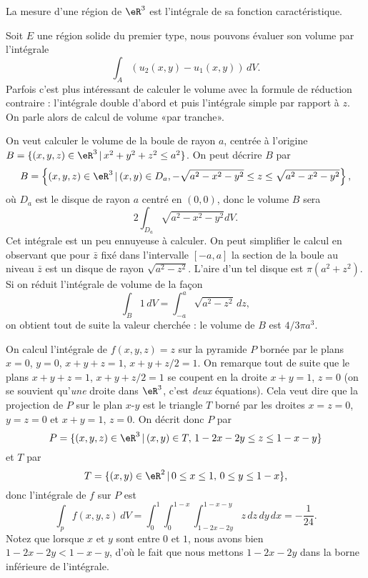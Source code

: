 \begin{definition}
   La mesure d'une région de  $\eR^3$ est l'intégrale de sa fonction caractéristique. 
\end{definition}
Soit $E$ une région solide du premier type, nous pouvons évaluer son volume par l'intégrale
\[
\int_A\left(u_2(x,y)-u_1(x,y)\right)\, dV.
\]  
Parfois c'est plus intéressant de calculer le volume avec la formule de réduction contraire : l'intégrale double d'abord et puis l'intégrale simple par rapport à $z$. On parle alors de calcul de volume «par tranche».
\begin{example}
On veut calculer le volume de la boule de rayon $a$, centrée à l'origine $B=\{(x,y,z)\in\eR^3\,\vert\, x^2+y^2+z^2\leq a^2 \}$. On peut décrire $B$ par
\[
  B=\left\{(x,y,z)\in\eR^3\,\vert\, (x,y)\in D_a, -\sqrt{a^2-x^2-y^2}\leq z\leq \sqrt{a^2-x^2-y^2}  \right\},
\]
où $D_a$ est le disque de rayon $a$ centré en $(0,0)$, donc le volume $B$ sera
\[
2 \int_{D_a}\sqrt{a^2-x^2-y^2} dV.
\] 
Cet intégrale est un peu ennuyeuse à calculer. On peut simplifier le calcul en observant que pour $\bar z$ fixé dans l'intervalle $[-a,a]$ la section de la boule au niveau $\bar z$ est un disque de rayon $\sqrt{a^2-z^2}$. L'aire d'un tel disque est  $\pi (a^2+z^2)$. Si on réduit l'intégrale de volume de la façon
\[
\int_{B} 1\, dV=\int_{-a}^{a}  \sqrt{a^2-z^2}\, dz,
\] 
on obtient tout de suite la valeur cherchée : le volume de $B$ est $4/3 \pi a^3$.   
\end{example}
\begin{example}
	On calcul l'intégrale de $f(x,y,z)=z$ sur la pyramide $P$ bornée par le plans $x=0$, $y=0$, $x+y+z=1$, $x+y+z/2=1$. On remarque tout de suite que le plans $x+y+z=1$, $x+y+z/2=1$ se coupent en la droite $x+y=1$, $z=0$ (on se souvient qu'\emph{une} droite dans $\eR^3$, c'est \emph{deux} équations). Cela veut dire que la projection de $P$ sur le plan $x$-$y$ est le  triangle $T$ borné par les droites $x=z=0$, $y=z=0$ et $x+y=1$, $z=0$.  
On  décrit donc $P$ par
\[
P=\{(x,y,z)\in\eR^3\,\vert\, (x,y)\in T, \, 1-2x-2y\leq z\leq 1-x-y\}
\] 
et $T$ par 
\[
T=\{(x,y)\in\eR^2\,\vert\, 0\leq x\leq 1,\,  0\leq y\leq 1-x\},
\]
donc l'intégrale de $f$ sur $P$ est 
\[
\int_pf(x,y,z)\, dV= \int_{0}^{1}\int_{0}^{1-x}\int_{1-2x-2y}^{1-x-y}z \,dz\,dy\,dx=-\frac{1}{ 24 }.
\]
Notez que lorsque $x$ et $y$ sont entre $0$ et $1$, nous avons bien $1-2x-2y<1-x-y$, d'où le fait que nous mettons $1-2x-2y$ dans la borne inférieure de l'intégrale.
\end{example}

